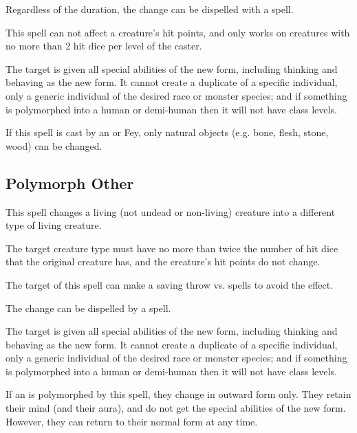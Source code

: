 \begin{multicols*}{2}
Regardless of the duration, the change can be dispelled with a  spell.

This spell can not affect a creature’s hit points, and only works on creatures with no more than 2 hit dice per level of the caster.

The target is given all special abilities of the new form, including thinking and behaving as the new form. It cannot create a duplicate of a specific individual, only a generic individual of the desired race or monster species; and if something is polymorphed into a human or demi-human then it will not have class levels.

If this spell is cast by an  or Fey, only natural objects (e.g. bone, flesh, stone, wood) can be changed.

\subsection{Polymorph Other}\label{spell:Polymorph Other}

This spell changes a living (not undead or non-living) creature into a different type of living creature.

The target creature type must have no more than twice the number of hit dice that the original creature has, and the creature’s hit points do not change.

The target of this spell can make a saving throw vs. spells to avoid the effect.

The change can be dispelled by a  spell.

The target is given all special abilities of the new form, including thinking and behaving as the new form. It cannot create a duplicate of a specific individual, only a generic individual of the desired race or monster species; and if something is polymorphed into a human or demi-human then it will not have class levels.

If an  is polymorphed by this spell, they change in outward form only. They retain their mind (and their aura), and do not get the special abilities of the new form. However, they can return to their normal form at any time.


\end{multicols*}
